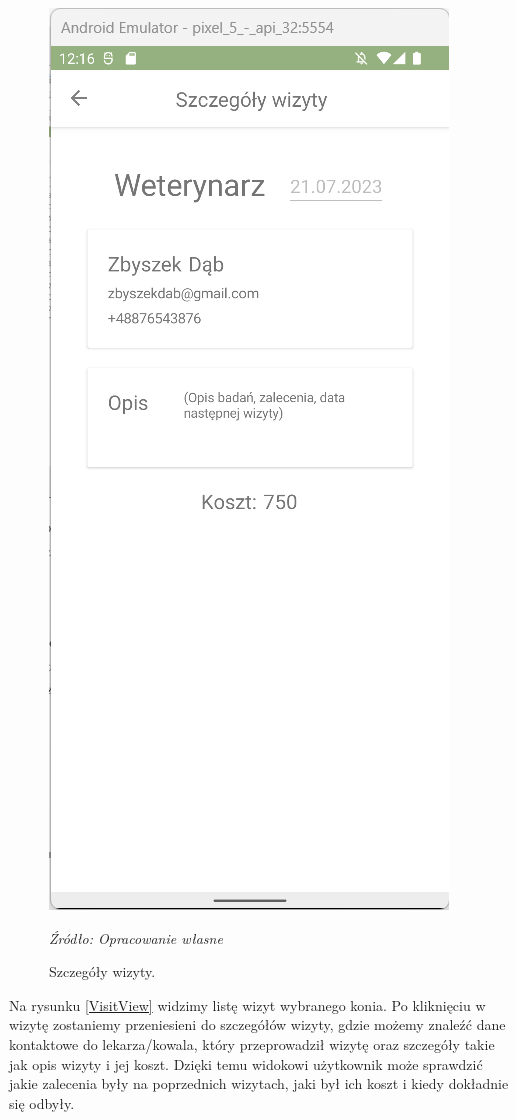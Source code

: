 \documentclass[12pt,oneside]{report}
\begin{document}
\begin{figure}[H]
\begin{center}
\begin{minipage}{5cm}
		\includegraphics[scale=0.6]{VisitViewDetails}
		\caption{\centering Szczegóły wizyty.}
		\textit{Źródło: Opracowanie własne}
		\label{VisitDetailsView}
	\end{minipage}
\end{center}
\end{figure}
Na rysunku \ref{VisitView} widzimy listę wizyt wybranego konia. Po kliknięciu w wizytę zostaniemy przeniesieni do szczegółów wizyty, gdzie możemy znaleźć dane kontaktowe do lekarza/kowala, który przeprowadził wizytę oraz szczegóły takie jak opis wizyty i jej koszt. Dzięki temu widokowi użytkownik może sprawdzić jakie zalecenia były na poprzednich wizytach, jaki był ich koszt i kiedy dokładnie się odbyły.
\end{document}
